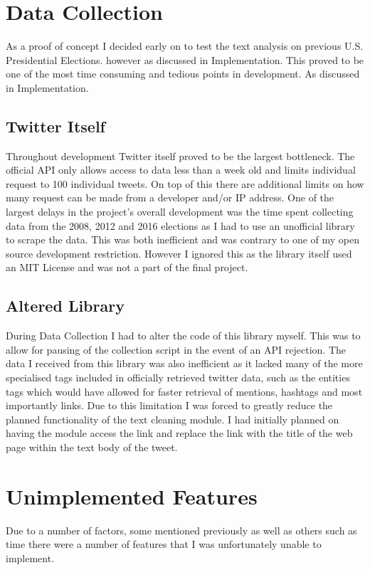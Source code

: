 \documentclass[12pt,a4paper]{report}
\begin{document}
  \section{Data Collection}
  As a proof of concept I decided early on to test the text analysis on previous U.S. Presidential Elections. however as discussed in Implementation. This proved to be one of the most time consuming and tedious points in development. As discussed in Implementation.
    \subsection{Twitter Itself}
    Throughout development Twitter itself proved to be the largest bottleneck. The official API only allows access to data less than a week old and limits individual request to 100 individual tweets. On top of this there are additional limits on how many request can be made from a developer and/or IP address\cite{TwitterAPILimits}. One of the largest delays in the project’s overall development was the time spent collecting data from the 2008, 2012 and 2016 elections as I had to use an unofficial library to scrape the data. This was both inefficient and was contrary to one of my open source development restriction. However I ignored this as the library itself used an MIT License\cite{MITLicense} and was not a part of the final project. 
    \subsection{Altered Library}
    During Data Collection I had to alter the code of this library myself. This was to allow for pausing of the collection script in the event of an API rejection. The data I received from this library was also inefficient as it lacked many of the more specialised tags included in officially retrieved twitter data, such as the entities tags which would have allowed for faster retrieval of mentions, hashtags and most importantly links. Due to this limitation I was forced to greatly reduce the planned functionality of the text cleaning module. I had initially planned on having the module access the link and replace the link with the title of the web page within the text body of the tweet.
  \section{Unimplemented Features}
  Due to a number of factors, some mentioned previously as well as others such as time there were a number of features that I was unfortunately unable to implement.
\end{document}
